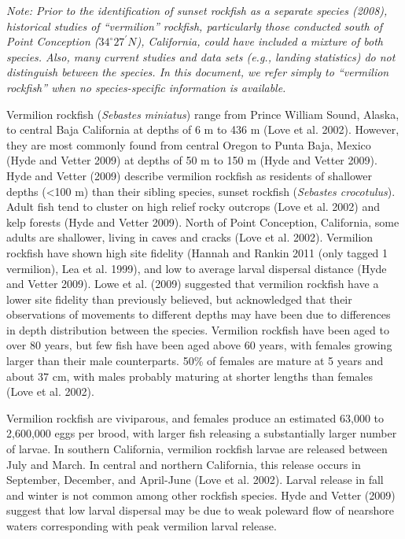 \documentclass[
  english,
  a4paper,
]{article}
\begin{document}
\emph{Note: Prior to the identification of sunset rockfish as a separate species (2008), historical studies of ``vermilion'' rockfish, particularly those conducted south of Point Conception ($34^\circ 27^\prime N$), California, could have included a mixture of both species. Also, many current studies and data sets (e.g., landing statistics) do not distinguish between the species. In this document, we refer simply to ``vermilion rockfish'' when no species-specific information is available.}

Vermilion rockfish (\emph{Sebastes miniatus}) range from Prince William Sound, Alaska, to central Baja California at
depths of 6 m to 436 m (Love et al. 2002). However, they are most commonly found from central Oregon
to Punta Baja, Mexico (Hyde and Vetter 2009) at depths of 50 m to 150 m (Hyde and Vetter 2009). Hyde and Vetter
(2009) describe vermilion rockfish as residents of shallower depths (\textless100 m) than their sibling species,
sunset rockfish (\emph{Sebastes crocotulus}). Adult fish tend to cluster on high relief rocky outcrops (Love et al. 2002)
and kelp forests (Hyde and Vetter 2009). North of Point Conception, California, some adults are shallower,
living in caves and cracks (Love et al. 2002). Vermilion rockfish have shown high site fidelity
(Hannah and Rankin 2011 (only tagged 1 vermilion), Lea et al. 1999), and low to average larval dispersal
distance (Hyde and Vetter 2009). Lowe et al. (2009) suggested that vermilion rockfish
have a lower site fidelity than previously believed, but acknowledged that their
observations of movements to different depths may have been due to differences in depth distribution between the species.
Vermilion rockfish have been aged to over 80 years, but few fish have been aged above 60 years, with females growing larger than their male counterparts. 50\% of females are mature at 5 years and about
37 cm, with males probably maturing at shorter lengths than females (Love et al. 2002).

Vermilion rockfish are viviparous, and females produce an estimated 63,000 to 2,600,000 eggs per brood, with larger fish releasing a substantially larger number of larvae.
In southern California, vermilion rockfish larvae are released between July and March.
In central and northern California, this release occurs in September, December, and
April-June (Love et al. 2002). Larval release in fall and winter is not common among other
rockfish species. Hyde and Vetter (2009) suggest that low larval dispersal may
be due to weak poleward flow of nearshore waters corresponding with peak vermilion larval release.
\end{document}
